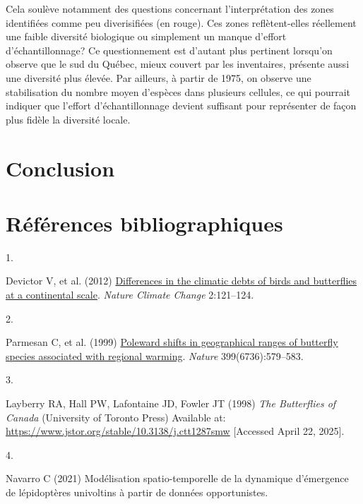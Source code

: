 \documentclass[9pt,twocolumn,twoside,]{pnas-new}
\newlength{\cslhangindent}
\newlength{\csllabelwidth}
\newenvironment{CSLReferences}[2] %
 {\begin{list}{}{%
  \setlength{\itemindent}{0pt}
  \setlength{\leftmargin}{0pt}
  \setlength{\parsep}{0pt}
  \ifodd #1
   \setlength{\leftmargin}{\cslhangindent}
   \setlength{\itemindent}{-1\cslhangindent}
  \fi
  \setlength{\itemsep}{#2\baselineskip}}}
 {\end{list}}
\newcommand{\CSLLeftMargin}[1]{\parbox[t]{\csllabelwidth}{#1}}
\newcommand{\CSLRightInline}[1]{\parbox[t]{\linewidth - \csllabelwidth}{#1}\break}
\begin{document}
Cela soulève notamment des questions concernant l'interprétation des
zones identifiées comme peu diverisifiées (en rouge). Ces zones
reflètent-elles réellement une faible diversité biologique ou simplement
un manque d'effort d'échantillonnage? Ce questionnement est d'autant
plus pertinent lorsqu'on observe que le sud du Québec, mieux couvert par
les inventaires, présente aussi une diversité plus élevée. Par ailleurs,
à partir de 1975, on observe une stabilisation du nombre moyen d'espèces
dans plusieurs cellules, ce qui pourrait indiquer que l'effort
d'échantillonnage devient suffisant pour représenter de façon plus
fidèle la diversité locale.

\section{Conclusion}\label{conclusion}

\section{Références
bibliographiques}\label{ruxe9fuxe9rences-bibliographiques}

\showmatmethods
\pnasbreak

\label{refs}
\begin{CSLReferences}{0}{1}
\CSLLeftMargin{1. }%
\CSLRightInline{Devictor V, et al. (2012)
\href{https://doi.org/10.1038/NCLIMATE1347}{Differences in the climatic
debts of birds and butterflies at a continental scale}. \emph{Nature
Climate Change} 2:121--124.}

\CSLLeftMargin{2. }%
\CSLRightInline{Parmesan C, et al. (1999)
\href{https://doi.org/10.1038/21181}{Poleward shifts in geographical
ranges of butterfly species associated with regional warming}.
\emph{Nature} 399(6736):579--583.}

\CSLLeftMargin{3. }%
\CSLRightInline{Layberry RA, Hall PW, Lafontaine JD, Fowler JT (1998)
\emph{The {Butterflies} of {Canada}} (University of Toronto Press)
Available at: \url{https://www.jstor.org/stable/10.3138/j.ctt1287smw}
{[}Accessed April 22, 2025{]}.}

\CSLLeftMargin{4. }%
\CSLRightInline{Navarro C (2021) Modélisation spatio-temporelle de la
dynamique d'émergence de lépidoptères univoltins à partir de données
opportunistes.}

\end{CSLReferences}



% 
\end{document}
